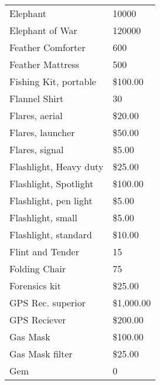 \documentclass[twoside]{book}
\begin{document}
\begin{longtable}{p{1.25in}l}
  \raggedright
           Elephant 
  &
   10000 
  \tabularnewline
      
  \raggedright
           Elephant of War 
  &
   120000 
  \tabularnewline
      
  \raggedright
           Feather Comforter 
  &
   600 
  \tabularnewline
      
  \raggedright
           Feather Mattress 
  &
   500 
  \tabularnewline
      
  \raggedright
           Fishing Kit, portable 
  &
   \$100.00 
  \tabularnewline
      
  \raggedright
           Flannel Shirt 
  &
   30 
  \tabularnewline
      
  \raggedright
           Flares, aerial 
  &
   \$20.00 
  \tabularnewline
      
  \raggedright
           Flares, launcher 
  &
   \$50.00 
  \tabularnewline
      
  \raggedright
           Flares, signal 
  &
   \$5.00 
  \tabularnewline
      
  \raggedright
           Flashlight, Heavy duty 
  &
   \$25.00 
  \tabularnewline
      
  \raggedright
           Flashlight, Spotlight 
  &
   \$100.00 
  \tabularnewline
      
  \raggedright
           Flashlight, pen light 
  &
   \$5.00 
  \tabularnewline
      
  \raggedright
           Flashlight, small 
  &
   \$5.00 
  \tabularnewline
      
  \raggedright
           Flashlight, standard 
  &
   \$10.00 
  \tabularnewline
      
  \raggedright
           Flint and Tender 
  &
   15 
  \tabularnewline
      
  \raggedright
           Folding Chair 
  &
   75 
  \tabularnewline
      
  \raggedright
           Forensics kit 
  &
   \$25.00 
  \tabularnewline
      
  \raggedright
           GPS Rec. superior 
  &
   \$1,000.00 
  \tabularnewline
      
  \raggedright
           GPS Reciever 
  &
   \$200.00 
  \tabularnewline
      
  \raggedright
           Gas Mask 
  &
   \$100.00 
  \tabularnewline
      
  \raggedright
           Gas Mask filter 
  &
   \$25.00 
  \tabularnewline
      
  \raggedright
           Gem 
  &
   0 
  \tabularnewline
      

\end{longtable}
\end{document}
